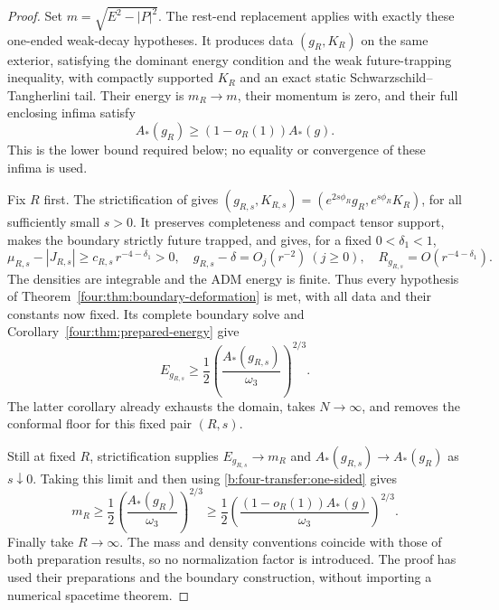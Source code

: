 \begin{proof}
Set $m=\sqrt{E^2-|P|^2}$.  The rest-end replacement
\cite[Proposition~8.8]{NumericalCompanion} applies with exactly these
one-ended weak-decay hypotheses.  It produces data $(g_R,K_R)$ on the
same exterior, satisfying the dominant energy condition and the weak
future-trapping inequality, with compactly supported $K_R$ and an exact
static Schwarzschild--Tangherlini tail.  Their energy is
$m_R\to m$, their momentum is zero, and their full enclosing infima
satisfy
\begin{equation}\label{b:four-transfer:one-sided}
 A_*(g_R)\ge(1-o_R(1))A_*(g).
\end{equation}
This is the lower bound required below; no equality or convergence of
these infima is used.

Fix $R$ first.  The strictification of
\cite[Lemma~8.9]{NumericalCompanion} gives
$(g_{R,s},K_{R,s})=(e^{2s\phi_R}g_R,e^{s\phi_R}K_R)$, for all
sufficiently small $s>0$.  It preserves completeness and compact tensor
support, makes the boundary strictly future trapped, and gives, for a
fixed $0<\delta_1<1$,
\[
 \mu_{R,s}-|J_{R,s}|\ge c_{R,s}\,r^{-4-\delta_1}>0,
 \quad g_{R,s}-\delta=O_j(r^{-2})\ (j\ge0),
 \quad R_{g_{R,s}}=O(r^{-4-\delta_1}).
\]
The densities are integrable and the ADM energy is finite.  Thus every
hypothesis of Theorem~\ref{four:thm:boundary-deformation} is met, with
all data and their constants now fixed.  Its complete boundary solve
and Corollary~\ref{four:thm:prepared-energy} give
\[
 E_{g_{R,s}}\ge
       \frac12\left(\frac{A_*(g_{R,s})}{\omega_3}\right)^{2/3}.
\]
The latter corollary already exhausts the domain, takes $N\to\infty$,
and removes the conformal floor for this fixed pair $(R,s)$.

Still at fixed $R$, strictification supplies
$E_{g_{R,s}}\to m_R$ and $A_*(g_{R,s})\to A_*(g_R)$ as $s\downarrow0$.
Taking this limit and then using \eqref{b:four-transfer:one-sided} gives
\[
 m_R\ge\frac12\left(\frac{A_*(g_R)}{\omega_3}\right)^{2/3}
 \ge\frac12\left(\frac{(1-o_R(1))A_*(g)}{\omega_3}\right)^{2/3}.
\]
Finally take $R\to\infty$.  The mass and density conventions coincide
with those of both preparation results, so no normalization factor is
introduced.  The proof has used their preparations and the boundary
construction, without importing a numerical spacetime theorem.
\end{proof}
